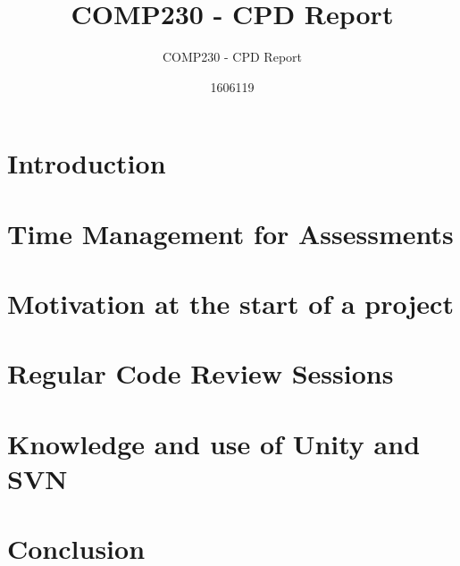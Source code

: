 \documentclass{scrartcl}
\title{COMP230 - CPD Report}
\subtitle{COMP230 - CPD Report}
\author{1606119}
\begin{document}
\maketitle

\section{Introduction}



\section{Time Management for Assessments}


\section{Motivation at the start of a project}


\section{Regular Code Review Sessions}


\section{Knowledge and use of Unity and SVN}
 

\section{}


\section{Conclusion}








\end{document}
